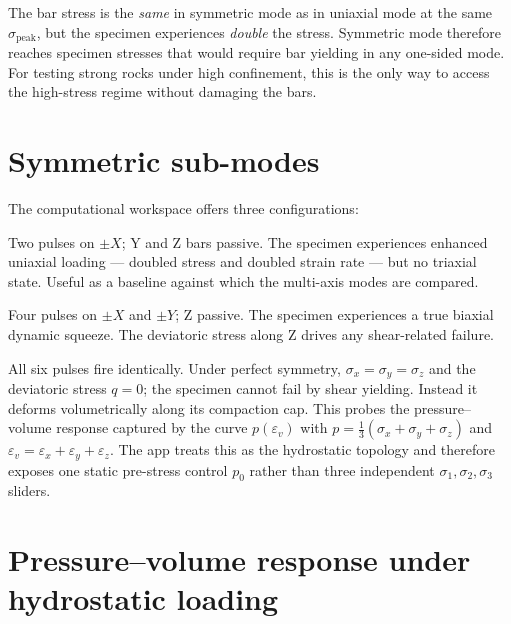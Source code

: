\documentclass[11pt,a4paper,openany]{book}
\theoremstyle{handbook}
\newcommand{\sig}{\sigma}
\newcommand{\eps}{\varepsilon}
\newcommand{\sigpeak}{\sig_{\text{peak}}}
\begin{document}
\begin{warningbox}
The bar stress is the \emph{same} in symmetric mode as in uniaxial mode at
the same $\sigpeak$, but the specimen experiences \emph{double} the stress.
Symmetric mode therefore reaches specimen stresses that would require bar
yielding in any one-sided mode. For testing strong rocks under high
confinement, this is the only way to access the high-stress regime without
damaging the bars.
\end{warningbox}

\section{Symmetric sub-modes}

The computational workspace offers three configurations:

\begin{description}[leftmargin=2em,style=nextline]
  \item[Symmetric $\pm X$ only]
    Two pulses on $\pm X$; Y and Z bars passive. The specimen experiences
    enhanced uniaxial loading --- doubled stress and doubled strain rate
    --- but no triaxial state. Useful as a baseline against which the
    multi-axis modes are compared.
  \item[Symmetric $\pm X\pm Y$ (biaxial)]
    Four pulses on $\pm X$ and $\pm Y$; Z passive. The specimen experiences
    a true biaxial dynamic squeeze. The deviatoric stress along Z drives
    any shear-related failure.
  \item[Full hydrostatic ($\pm X,\pm Y,\pm Z$)]
    All six pulses fire identically. Under perfect symmetry,
    $\sig_x=\sig_y=\sig_z$ and the deviatoric stress $q=0$; the specimen
    cannot fail by shear yielding. Instead it deforms volumetrically along
    its compaction cap. This probes the pressure--volume response captured
    by the curve $p(\eps_v)$ with $p=\tfrac{1}{3}(\sig_x+\sig_y+\sig_z)$
    and $\eps_v=\eps_x+\eps_y+\eps_z$. The app treats this as the
    hydrostatic topology and therefore exposes one static pre-stress
    control $p_0$ rather than three independent $\sig_1,\sig_2,\sig_3$
    sliders.
\end{description}

\section{Pressure--volume response under hydrostatic loading}
\end{document}
